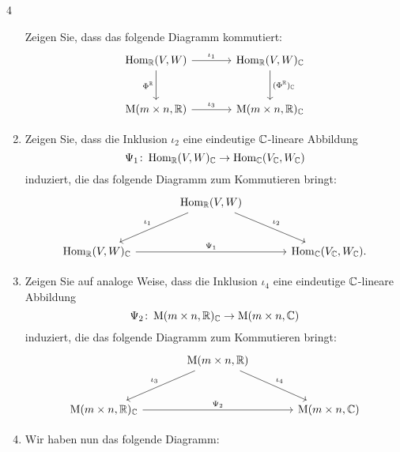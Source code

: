 \begin{question}[subtitle = Komplexifizierung von Abbildungen und Matrizen in einem kommutierenden Prisma]{4}
\begin{enumerate}[leftmargin=*]
      Zeigen Sie, dass das folgende Diagramm kommutiert:
      \[
        \begin{tikzcd}[row sep = large, column sep = large, ampersand replacement = \&]
                \Hom_\Rbb(V, W)             \arrow{r}{\iota_1}
                                            \arrow[swap]{d}{\Phi^\Rbb}
            \&  \Hom_\Rbb(V, W)_\Cbb        \arrow{d}{(\Phi^\Rbb)_\Cbb}
          \\
                \Mat(m \times n, \Rbb)      \arrow{r}{\iota_3}
            \&  \Mat(m \times n, \Rbb)_\Cbb
        \end{tikzcd}
      \]
    \item
      Zeigen Sie, dass die Inklusion $\iota_2$ eine eindeutige $\mathbb{C}$-lineare Abbildung
      \[
        \Psi_1 \colon \operatorname{Hom}_{\mathbb{R}}(V,W)_{\mathbb{C}} \to \operatorname{Hom}_{\mathbb{C}}(V_{\mathbb{C}}, W_{\mathbb{C}})
      \]
      induziert, die das folgende Diagramm zum Kommutieren bringt:
      \[
        \begin{tikzcd}[row sep = large, column sep = large, ampersand replacement = \&]
                  {}
              \&  \Hom_\Rbb(V,W)            \arrow[swap]{ld}{\iota_1}
                                            \arrow{rd}{\iota_2}
              \&  {}
          \\
                  \Hom_\Rbb(V,W)_\Cbb       \arrow{rr}{\Psi_1}
              \&  {}
              \&  \Hom_\Cbb(V_\Cbb, W_\Cbb).
        \end{tikzcd}
      \]
    \item
      Zeigen Sie auf analoge Weise, dass die Inklusion $\iota_4$ eine eindeutige $\mathbb{C}$-lineare Abbildung
      \[
        \Psi_2 \colon \operatorname{M}(m \times n, \mathbb{R})_{\mathbb{C}} \to \operatorname{M}(m \times n, \mathbb{C})
      \]
      induziert, die das folgende Diagramm zum Kommutieren bringt:
      \[
        \begin{tikzcd}[row sep = large, column sep = large, ampersand replacement = \&]
                  {}
              \&  \Mat(m \times n, \Rbb)      \arrow[swap]{ld}{\iota_3}
                                              \arrow{rd}{\iota_4}
              \&  {}
          \\
                  \Mat(m \times n, \Rbb)_\Cbb \arrow{rr}{\Psi_2}
              \&  {}
              \&  \Mat(m \times n, \Cbb)
        \end{tikzcd}
      \]
    \item
      Wir haben nun das folgende Diagramm:
      \[
        \begin{tikzcd}[row sep = large, column sep = large, ampersand replacement = \&]

\end{tikzcd}\]
\end{enumerate}
\end{question}
